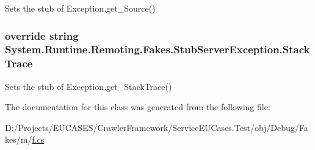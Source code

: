 Sets the stub of Exception.\-get\-\_\-\-Source()

\hypertarget{class_system_1_1_runtime_1_1_remoting_1_1_fakes_1_1_stub_server_exception_ab68fc93c3f4b5c201b0fbfab8e5bb406}{
\subsubsection[{Stack\-Trace}]{\setlength{\rightskip}{0pt plus 5cm}override string System.\-Runtime.\-Remoting.\-Fakes.\-Stub\-Server\-Exception.\-Stack\-Trace\hspace{0.3cm}{\ttfamily [get]}}}\label{class_system_1_1_runtime_1_1_remoting_1_1_fakes_1_1_stub_server_exception_ab68fc93c3f4b5c201b0fbfab8e5bb406}


Sets the stub of Exception.\-get\-\_\-\-Stack\-Trace()



The documentation for this class was generated from the following file\-:\begin{DoxyCompactItemize}
\item 
D\-:/\-Projects/\-E\-U\-C\-A\-S\-E\-S/\-Crawler\-Framework/\-Service\-E\-U\-Cases.\-Test/obj/\-Debug/\-Fakes/m/\hyperlink{m_2f_8cs}{f.\-cs}\end{DoxyCompactItemize}
